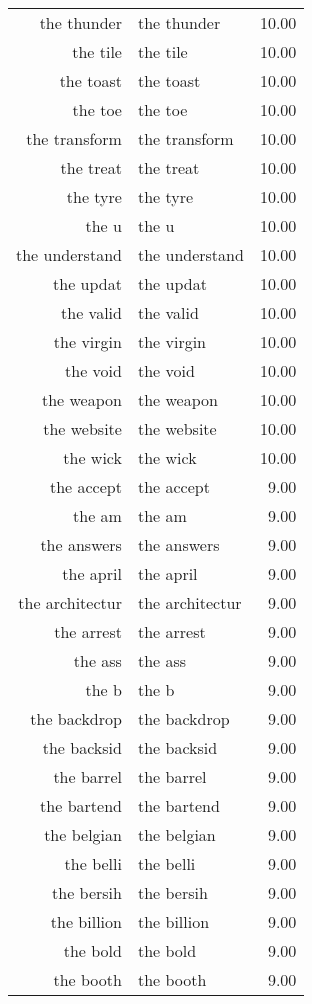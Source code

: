 \begin{table}[ht]
\begin{tabular}{rlr}
  the thunder & the thunder & 10.00 \\ 
  the tile & the tile & 10.00 \\ 
  the toast & the toast & 10.00 \\ 
  the toe & the toe & 10.00 \\ 
  the transform & the transform & 10.00 \\ 
  the treat & the treat & 10.00 \\ 
  the tyre & the tyre & 10.00 \\ 
  the u & the u & 10.00 \\ 
  the understand & the understand & 10.00 \\ 
  the updat & the updat & 10.00 \\ 
  the valid & the valid & 10.00 \\ 
  the virgin & the virgin & 10.00 \\ 
  the void & the void & 10.00 \\ 
  the weapon & the weapon & 10.00 \\ 
  the website & the website & 10.00 \\ 
  the wick & the wick & 10.00 \\ 
  the accept & the accept & 9.00 \\ 
  the am & the am & 9.00 \\ 
  the answers & the answers & 9.00 \\ 
  the april & the april & 9.00 \\ 
  the architectur & the architectur & 9.00 \\ 
  the arrest & the arrest & 9.00 \\ 
  the ass & the ass & 9.00 \\ 
  the b & the b & 9.00 \\ 
  the backdrop & the backdrop & 9.00 \\ 
  the backsid & the backsid & 9.00 \\ 
  the barrel & the barrel & 9.00 \\ 
  the bartend & the bartend & 9.00 \\ 
  the belgian & the belgian & 9.00 \\ 
  the belli & the belli & 9.00 \\ 
  the bersih & the bersih & 9.00 \\ 
  the billion & the billion & 9.00 \\ 
  the bold & the bold & 9.00 \\ 
  the booth & the booth & 9.00 \\ 

\end{tabular}
\end{table}
